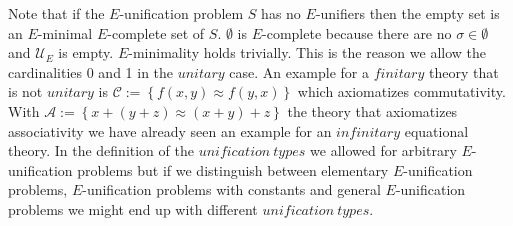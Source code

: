Note that if the $E$-unification problem $S$ has no $E$-unifiers then the empty set is an $E$-minimal $E$-complete set of $S$. $\emptyset$ is $E$-complete because there are no $\sigma\in\emptyset$ and $\mathcal{U}_E$ is empty. $E$-minimality holds trivially. This is the reason we allow the cardinalities 0 and 1 in the $unitary$ case.
An example for a $finitary$ theory that is not $unitary$ is $\mathcal{C}:=\left\lbrace f(x,y)\approx f(y,x)\right\rbrace$ which axiomatizes commutativity.
With $\mathcal{A}:=\left\lbrace x+(y+z)\approx (x+y)+z\right\rbrace$ the theory that axiomatizes associativity we have already seen an example for an $infinitary$ equational theory.
In the definition of the $unification\ types$ we allowed for arbitrary $E$-unification problems but if we distinguish between elementary $E$-unification problems, $E$-unification problems with constants and general $E$-unification problems we might end up with different $unification\ types$.